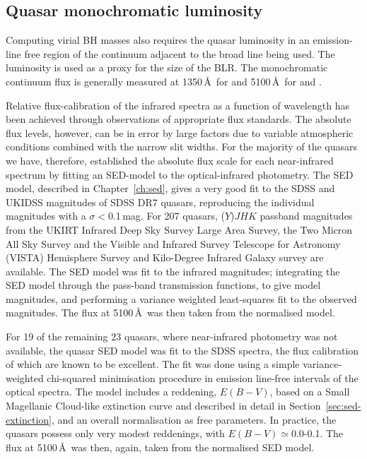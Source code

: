 \subsection{Quasar monochromatic luminosity}

Computing virial BH masses also requires the quasar luminosity in an emission-line free region of the continuum adjacent to the broad line being used. 
The luminosity is used as a proxy for the size of the BLR. 
The monochromatic continuum flux is generally measured at 1350\,\AA\ for  and 5100\,\AA\, for \ha and \hbns. 

Relative flux-calibration of the infrared spectra as a function of wavelength has been achieved through observations of appropriate flux standards. 
The absolute flux levels, however, can be in error by large factors due to variable atmospheric conditions combined with the narrow slit widths. 
For the majority of the quasars we have, therefore, established the absolute flux scale for each near-infrared spectrum by fitting an SED-model to the optical-infrared photometry. 
The SED model, described in Chapter~\ref{ch:sed}, gives a very good fit to the SDSS and UKIDSS magnitudes of SDSS DR7 quasars, reproducing the individual magnitudes with a $\sigma <$0.1\,mag. 
For 207 quasars, ($Y$)$JHK$ passband magnitudes from the UKIRT Infrared Deep Sky Survey \citep[UKIDSS;][]{lawrence07} Large Area Survey, the Two Micron All Sky Survey \citep[2MASS;][]{skrutskie06} and the Visible and Infrared Survey Telescope for Astronomy (VISTA) Hemisphere Survey \citep[VHS;][]{mcmahon13} and Kilo-Degree Infrared Galaxy \citep[VIKING;][]{edge13} survey are available. 
The SED model was fit to the infrared magnitudes; integrating the SED model through the pass-band transmission functions, to give model magnitudes, and performing a variance weighted least-squares fit to the observed magnitudes. 
The flux at 5100\,\AA\, was then taken from the normalised model.

For 19 of the remaining 23 quasars, where near-infrared photometry was not available, the quasar SED model was fit to the SDSS spectra, the flux calibration of which are known to be excellent.  
The fit was done using a simple variance-weighted chi-squared minimisation procedure in emission line-free intervals of the optical spectra.   
The model includes a reddening, $E(B-V)$, based on a Small Magellanic Cloud-like extinction curve and described in detail in Section~\ref{sec:sed-extinction}, and an overall normalisation as free parameters.
In practice, the quasars possess only very modest reddenings, with $E(B-V)\simeq$0.0-0.1.
The flux at 5100\,\AA\, was then, again, taken from the normalised SED model.

